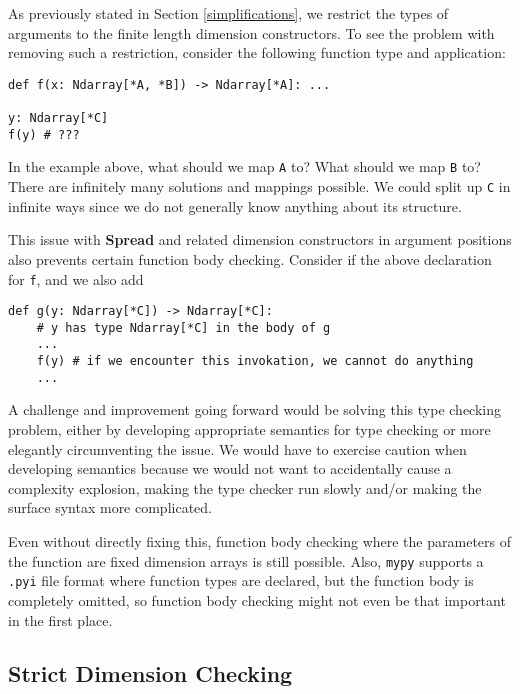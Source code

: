 \documentclass[12pt]{report}
\begin{document}
As previously stated in Section \ref{simplifications}, we restrict the types of arguments to the finite length dimension constructors. To see the problem with removing such a restriction, consider the following function type and application:

\begin{singlespace*}
    \begin{verbatim}
def f(x: Ndarray[*A, *B]) -> Ndarray[*A]: ...

y: Ndarray[*C]
f(y) # ???\end{verbatim}
\end{singlespace*}
In the example above, what should we map \texttt{A} to? What should we map \texttt{B} to? There are infinitely many solutions and mappings possible. We could split up \texttt{C} in infinite ways since we do not generally know anything about its structure.

This issue with \textbf{Spread} and related dimension constructors in argument positions also prevents certain function body checking. Consider if the above declaration for \texttt{f}, and we also add

\begin{singlespace*}
    \begin{verbatim}
def g(y: Ndarray[*C]) -> Ndarray[*C]:
    # y has type Ndarray[*C] in the body of g
    ...
    f(y) # if we encounter this invokation, we cannot do anything
    ...\end{verbatim}

\end{singlespace*}
A challenge and improvement going forward would be solving this type checking problem, either by developing appropriate semantics for type checking or more elegantly circumventing the issue. We would have to exercise caution when developing semantics because we would not want to accidentally cause a complexity explosion, making the type checker run slowly and/or making the surface syntax more complicated.

Even without directly fixing this, function body checking where the parameters of the function are fixed dimension arrays is still possible. Also, \texttt{mypy} supports a \texttt{.pyi} file format where function types are declared, but the function body is completely omitted, so function body checking might not even be that important in the first place.

\subsection{Strict Dimension Checking}
\end{document}
